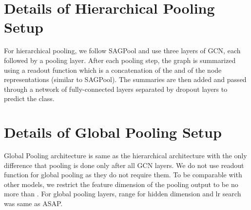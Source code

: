 \documentclass[letterpaper]{article} \usepackage{aaai20}  \usepackage{times}  \usepackage{helvet} \usepackage{courier}  \usepackage[hyphens]{url}  \usepackage{graphicx} \urlstyle{rm} \def\UrlFont{\rm}  \usepackage{graphicx}  \frenchspacing  \setlength{\pdfpagewidth}{8.5in}  \setlength{\pdfpageheight}{11in}
\begin{document}
	
	\section{Details of Hierarchical Pooling Setup}
	\label{ssec:global-pool}
	For hierarchical pooling, we follow SAGPool \cite{sag} and use three layers of GCN, each followed by a pooling layer. After each pooling step, the graph is summarized using a readout function which is a concatenation of the  and  of the node representations (similar to SAGPool). The summaries are then added and passed through a network of fully-connected layers separated by dropout layers to predict the class.
	
	
	\section{Details of Global Pooling Setup}
	Global Pooling architecture is same as the hierarchical architecture with the only difference that pooling is done only after all GCN layers. We do not use readout function for global pooling as they do not require them. To be comparable with other models, we restrict the feature dimension of the pooling output to be no more than . For global pooling layers, range for hidden dimension and lr search was same as ASAP.
	
	\begin{table}[tbh!]
\begin{center}
			\begin{small}
				\caption{\label{tab:statistics}Global Pooling Hyperparameter Tuning Summary.}
\end{small}
		\end{center}
		\vskip -0.1in
	\end{table}
	
	
\end{document}
